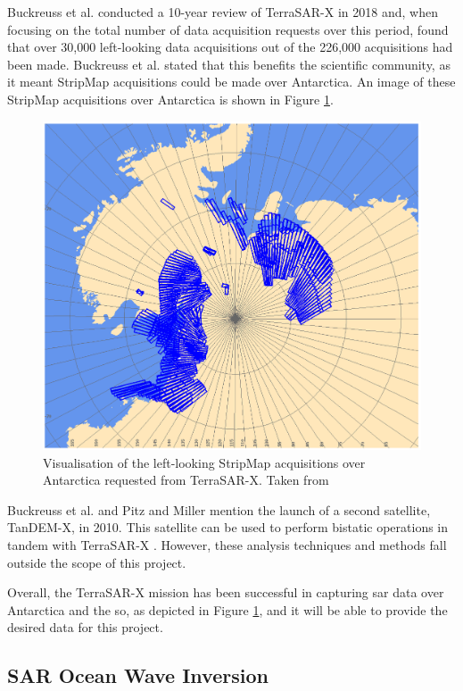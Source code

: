 Buckreuss et al. \cite{Buckreuss2018} conducted a 10-year review of TerraSAR-X in 2018 and, when focusing on the total number of data acquisition requests over this period, found that over 30,000 left-looking data acquisitions out of the 226,000 acquisitions had been made. Buckreuss et al. stated that this benefits the scientific community, as it meant StripMap acquisitions could be made over Antarctica. An image of these StripMap acquisitions over Antarctica is shown in Figure \ref{fig:litReview.sarCharac.satellites.terraSAR.antarcticStripmaps}.

\begin{figure}[H]
    \centering
    \includegraphics[width=.5\linewidth]{Figures/LiteratureReview/Satellites/TerraSAR_Antarctic_Acquisitions.png}
    \caption{Visualisation of the left-looking StripMap acquisitions over Antarctica requested from TerraSAR-X. Taken from \cite{Buckreuss2018}}
    \label{fig:litReview.sarCharac.satellites.terraSAR.antarcticStripmaps}
\end{figure}

Buckreuss et al. \cite{Buckreuss2018} and Pitz and Miller \cite{Pitz2010} mention the launch of a second satellite, TanDEM-X, in 2010. This satellite can be used to perform bistatic operations in tandem with TerraSAR-X \cite{Pitz2010, Buckreuss2018}. However, these analysis techniques and methods fall outside the scope of this project.

Overall, the TerraSAR-X mission has been successful in capturing \acs{sar} data over Antarctica and the \acs{so}, as depicted in Figure \ref{fig:litReview.sarCharac.satellites.terraSAR.antarcticStripmaps}, and it will be able to provide the desired data for this project.

\subsection{SAR Ocean Wave Inversion} \label{subsec:litReview.sarCharac.oceanWaveInversion}

